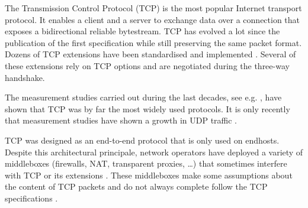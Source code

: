 
The Transmission Control Protocol (TCP) \cite{rfc793} is the most
popular Internet transport protocol. It enables a client and a server
to exchange data over a connection that exposes a bidirectional
reliable bytestream. 
TCP has evolved a lot since the publication of
the first specification while still preserving the same packet
format. Dozens of TCP extensions have been standardised and
implemented \cite{RFC7414}. Several of these extensions rely on TCP
options and are negotiated during the three-way handshake.

The measurement studies carried out during the last decades, see
e.g. \cite{paxson1994growth,claffy1993traffic,maier2009dominant,trevisan2020five},
have shown that TCP was by far the most widely used protocols. It is
only recently that measurement studies have shown a growth in UDP
traffic \cite{trevisan2020five}.  



TCP was designed as an end-to-end protocol that is only used on
endhosts. Despite this architectural principale, network operators
have deployed a variety of middleboxes (firewalls, NAT, transparent
proxies, \ldots) that sometimes interfere with TCP or its extensions
\cite{medina2004measuring, honda2011still, edeline2017first}.
These middleboxes make some assumptions about the content of TCP
packets and do not always complete follow the TCP specifications
\cite{honda2011still, hesmans2013tcp}. 






